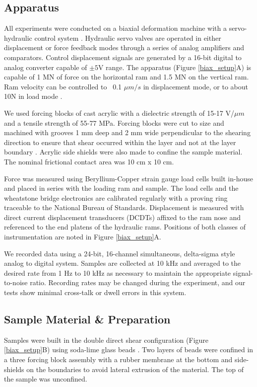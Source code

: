 \subsection{Apparatus}

All experiments were conducted on a biaxial deformation machine with a servo-hydraulic control system \citep{Karner:2000tj,Frye:2002jj}.  Hydraulic servo valves are operated in either displacement or force feedback modes through a series of analog amplifiers and comparators.  Control displacement signals are generated by a 16-bit digital to analog converter capable of $\pm 5$V range.  The apparatus (Figure \ref{biax_setup}A) is capable of 1 MN of force on the horizontal ram and 1.5 MN on the vertical ram.  Ram velocity can be controlled to ~0.1 $\mu m/s$ in displacement mode, or to about 10N in load mode \citep{Hong:2005gd,Rathbun:2008ks}.

We used forcing blocks of cast acrylic with a dielectric strength of 15-17 V/$\mu m$ and a tensile strength of 55-77 MPa.  Forcing blocks were cut to size and machined with grooves 1 mm deep and 2 mm wide perpendicular to the shearing direction to ensure that shear occurred within the layer and not at the layer boundary \citep{Anthony:2005jo,Knuth:2007ci}.  Acrylic side shields were also made to confine the sample material. The nominal frictional contact area was 10 cm x 10 cm.

Force was measured using Beryllium-Copper strain gauge load cells built in-house and placed in series with the loading ram and sample. The load cells and the wheatstone bridge electronics are calibrated regularly with a proving ring traceable to the National Bureau of Standards.  Displacement is measured with direct current displacement transducers (DCDTs) affixed to the ram nose and referenced to the end platens of the hydraulic rams.  Positions of both classes of instrumentation are noted in Figure \ref{biax_setup}A. 

We recorded data using a 24-bit, 16-channel simultaneous, delta-sigma style analog to digital system.  Samples are collected at 10 kHz and averaged to the desired rate from 1 Hz to 10 kHz as necessary to maintain the appropriate signal-to-noise ratio.  Recording rates may be changed during the experiment, and our tests show minimal cross-talk or dwell errors in this system.

\subsection{Sample Material \& Preparation}
Samples were built in the double direct shear configuration (Figure \ref{biax_setup}B) using soda-lime glass beads \citep{Anthony:2005jo}.  Two layers of beads were confined in a three forcing block assembly with a rubber membrane at the bottom and side-shields on the boundaries to avoid lateral extrusion of the material.  The top of the sample was unconfined. 

